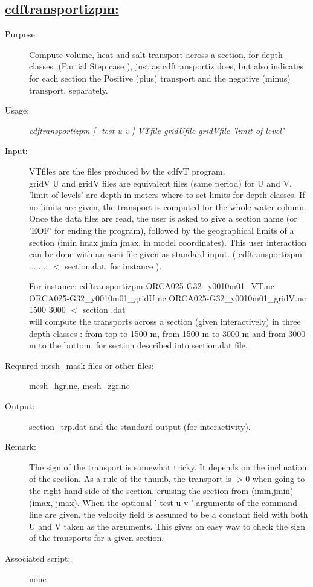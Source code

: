 \documentclass[a4paper,11pt]{article}
\begin{document}
\subsection*{\underline{cdftransportizpm:}}
\begin{description}
\item[Purpose:] Compute volume, heat and salt transport across a section, for depth classes. (Partial Step case ), just as cdftransportiz does,
         but also indicates for each section the Positive (plus) transport and the negative (minus) transport, separately.
\item[Usage:] {\em cdftransportizpm [ -test u v ] VTfile gridUfile gridVfile  'limit of level' }
\item[Input:] VTfiles are the files produced by the cdfvT program. \\
gridV U and gridV files are equivalent files (same period) for U and V. \\
'limit of levels' are depth in meters where to set limits for depth classes. If no limits are given, the transport is
computed for the whole water column. \\
Once the data  files are read, the user is asked to give a section name (or 'EOF' for ending the program), followed
by the geographical limits of a section (imin imax jmin jmax, in model coordinates). This user interaction can be done
with an ascii file given as standard input. ( cdftransportizpm ........ $<$ section.dat, for instance ).

For instance: cdftransportizpm ORCA025-G32\_y0010m01\_VT.nc ORCA025-G32\_y0010m01\_gridU.nc  ORCA025-G32\_y0010m01\_gridV.nc 
1500 3000 $<$ section .dat \\
will compute the transports across a section (given interactively) in three depth classes : from top to 1500 m, from 1500 m
to 3000 m and from 3000 m to the bottom, for section described into section.dat file.
\item[Required mesh\_mask files or other files:]   mesh\_hgr.nc, mesh\_zgr.nc
\item[Output:]section\_trp.dat and the standard output (for interactivity).
\item[Remark:] The sign of the transport is somewhat tricky. It depends on the inclination of the section. As a rule of 
the thumb, the transport is $>0$ when going to the right hand side of the section, cruising the section from (imin,jmin) 
(imax, jmax). When the optional '-test u v ' arguments of the command line are  given, the velocity field is assumed to 
be a constant field with both U and V taken as the arguments. This gives an easy way to check the sign of the transports for a given section.

\item[Associated script:] none
\end{description}
\end{document}
